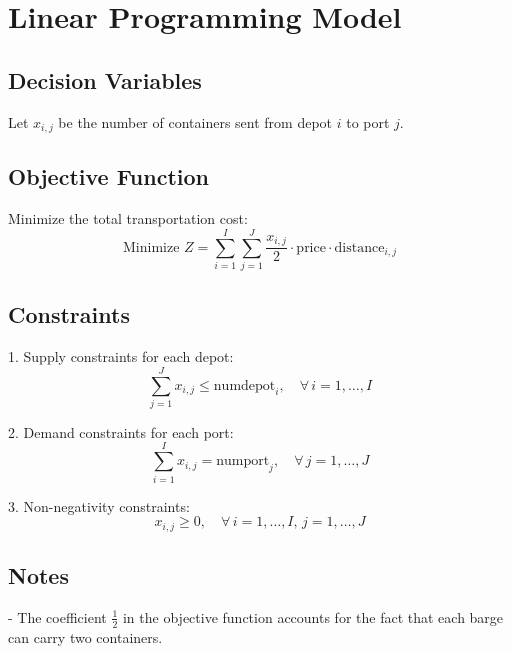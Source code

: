 \documentclass{article}
\begin{document}
\section*{Linear Programming Model}

\subsection*{Decision Variables}
Let \( x_{i, j} \) be the number of containers sent from depot \( i \) to port \( j \).

\subsection*{Objective Function}
Minimize the total transportation cost:
\[
\text{Minimize } Z = \sum_{i=1}^{I} \sum_{j=1}^{J} \frac{x_{i, j}}{2} \cdot \text{price} \cdot \text{distance}_{i, j}
\]

\subsection*{Constraints}
1. Supply constraints for each depot:
   \[
   \sum_{j=1}^{J} x_{i, j} \leq \text{numdepot}_{i}, \quad \forall \, i = 1, \ldots, I
   \]

2. Demand constraints for each port:
   \[
   \sum_{i=1}^{I} x_{i, j} = \text{numport}_{j}, \quad \forall \, j = 1, \ldots, J
   \]

3. Non-negativity constraints:
   \[
   x_{i, j} \geq 0, \quad \forall \, i = 1, \ldots, I, \, j = 1, \ldots, J
   \]

\subsection*{Notes}
- The coefficient \(\frac{1}{2}\) in the objective function accounts for the fact that each barge can carry two containers.
\end{document}
